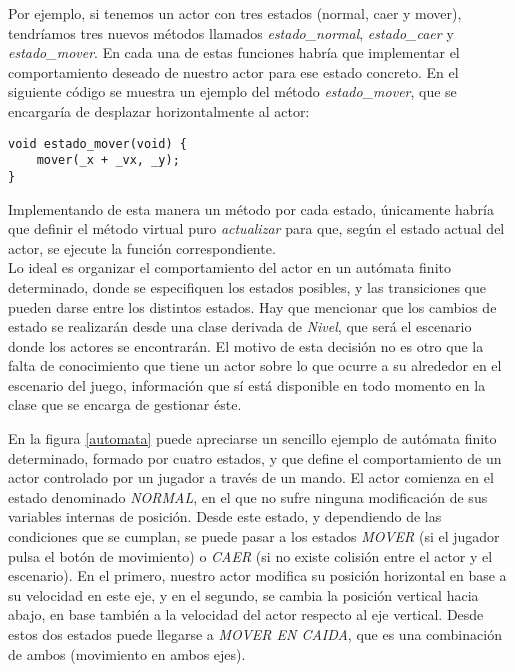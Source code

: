 Por ejemplo, si tenemos un actor con tres estados (normal, caer y mover), tendríamos tres nuevos métodos llamados \emph{estado\_normal}, \emph{estado\_caer} y \emph{estado\_mover}. En cada una de estas funciones habría que implementar el comportamiento deseado de nuestro actor para ese estado concreto. En el siguiente código se muestra un ejemplo del método \emph{estado\_mover}, que se encargaría de desplazar horizontalmente al actor:

\begin{lstlisting}[style=C++]
void estado_mover(void) {
    mover(_x + _vx, _y);
}
\end{lstlisting}

Implementando de esta manera un método por cada estado, únicamente habría que definir el método virtual puro \emph{actualizar} para que, según el estado actual del actor, se ejecute la función correspondiente.\\

Lo ideal es organizar el comportamiento del actor en un autómata finito determinado, donde se especifiquen los estados posibles, y las transiciones que pueden darse entre los distintos estados. Hay que mencionar que los cambios de estado se realizarán desde una clase derivada de \emph{Nivel}, que será el escenario donde los actores se encontrarán. El motivo de esta decisión no es otro que la falta de conocimiento que tiene un actor sobre lo que ocurre a su alrededor en el escenario del juego, información que sí está disponible en todo momento en la clase que se encarga de gestionar éste.\\


En la figura \ref{automata} puede apreciarse un sencillo ejemplo de autómata finito determinado, formado por cuatro estados, y que define el comportamiento de un actor controlado por un jugador a través de un mando. El actor comienza en el estado denominado \emph{NORMAL}, en el que no sufre ninguna modificación de sus variables internas de posición. Desde este estado, y dependiendo de las condiciones que se cumplan, se puede pasar a los estados \emph{MOVER} (si el jugador pulsa el botón de movimiento) o \emph{CAER} (si no existe colisión entre el actor y el escenario). En el primero, nuestro actor modifica su posición horizontal en base a su velocidad en este eje, y en el segundo, se cambia la posición vertical hacia abajo, en base también a la velocidad del actor respecto al eje vertical. Desde estos dos estados puede llegarse a \emph{MOVER EN CAIDA}, que es una combinación de ambos (movimiento en ambos ejes).\\


